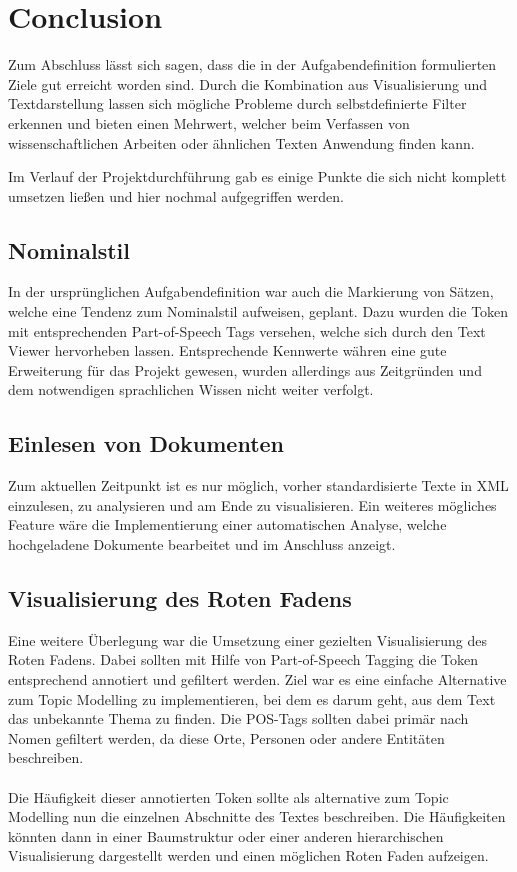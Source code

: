 \section{Conclusion}
Zum Abschluss l\"asst sich sagen, dass die in der Aufgabendefinition formulierten Ziele gut erreicht worden sind. Durch die Kombination aus Visualisierung und Textdarstellung lassen sich m\"ogliche Probleme durch selbstdefinierte Filter erkennen und bieten einen Mehrwert, welcher beim Verfassen von wissenschaftlichen Arbeiten oder \"ahnlichen Texten Anwendung finden kann. 

Im Verlauf der Projektdurchf\"uhrung gab es einige Punkte die sich nicht komplett umsetzen ließen und hier nochmal aufgegriffen werden.\\

\subsection*{Nominalstil}
In der urspr\"unglichen Aufgabendefinition war auch die Markierung von S\"atzen, welche eine Tendenz zum Nominalstil aufweisen, geplant. Dazu wurden die Token mit entsprechenden Part-of-Speech Tags versehen, welche sich durch den Text Viewer hervorheben lassen. Entsprechende Kennwerte w\"ahren eine gute Erweiterung f\"ur das Projekt gewesen, wurden allerdings aus Zeitgr\"unden und dem notwendigen sprachlichen Wissen nicht weiter verfolgt.

\subsection*{Einlesen von Dokumenten}
Zum aktuellen Zeitpunkt ist es nur m\"oglich, vorher standardisierte Texte in XML einzulesen, zu analysieren und am Ende zu visualisieren. Ein weiteres m\"ogliches Feature w\"are die Implementierung einer automatischen Analyse, welche hochgeladene Dokumente bearbeitet und im Anschluss anzeigt.

\subsection*{Visualisierung des Roten Fadens}
Eine weitere Überlegung war die Umsetzung einer gezielten Visualisierung des Roten Fadens. Dabei sollten mit Hilfe von Part-of-Speech Tagging die Token entsprechend annotiert und gefiltert werden. Ziel war es eine einfache Alternative zum Topic Modelling zu implementieren, bei dem es darum geht, aus dem Text das unbekannte Thema zu finden. Die POS-Tags sollten dabei prim\"ar nach Nomen gefiltert werden, da diese Orte, Personen oder andere Entit\"aten beschreiben.\\
\\
Die H\"aufigkeit dieser annotierten Token sollte als alternative zum Topic Modelling nun die einzelnen Abschnitte des Textes beschreiben. Die H\"aufigkeiten k\"onnten dann in einer Baumstruktur oder einer anderen hierarchischen Visualisierung dargestellt werden und einen m\"oglichen Roten Faden aufzeigen.

